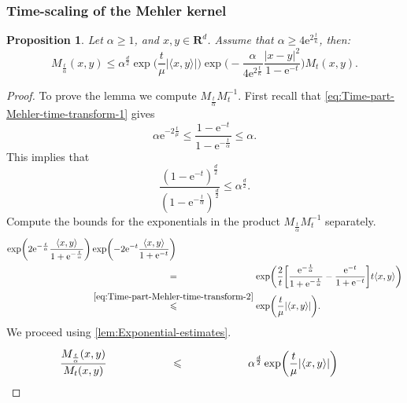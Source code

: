\documentclass[a4paper,oneside,10pt]{amsproc}
\newtheorem{proposition}{Proposition}
\theoremstyle{remark}
\newcommand{\la}{\langle}
\newcommand{\ra}{\rangle}
\renewcommand{\leq}{\leqslant}
\renewcommand{\leq}{\leqslant}
\renewcommand{\geq}{\geqslant}
\newcommand{\R}{\mathbf R}
\newcommand{\e}{\mathrm{e}} %
\renewcommand{\leq}{\leqslant}%
\renewcommand{\geq}{\geqslant}%
\begin{document}
\subsubsection{Time-scaling of the Mehler kernel}
\begin{proposition}\label{lem:Kernel-estimates-1}
  Let $\alpha \geq 1$, and $x, y \in \R^d$. Assume that $\alpha \geq 4 \e^{2
    \frac{t}{\kappa}}$, then:
  \begin{equation}
    \label{eq:Kernel-lemma-1-estimate} 
    M_{\frac{t}{\alpha}}(x, y) \leq \alpha^{\frac{d}2}
    \exp\biggl (\frac{t}{\mu} |\la x, y \ra| \biggr)
   \exp\biggl(-\frac{\alpha}{4\e^{2 \frac{t}{\kappa}}} \frac{|x - y|^2}{1 - \e^{-t}}
   \biggr) M_{t}(x, y).
  \end{equation}
\end{proposition}
\begin{proof}
  To prove the lemma we compute $M_{\frac{t}{\alpha}} M_t^{-1}$.
  First recall that \eqref{eq:Time-part-Mehler-time-transform-1} gives
  \begin{equation*}
    \alpha \e^{-2\frac{t}\mu} \leq \frac{1 - \e^{-t}}{1 -
      \e^{-\frac{t}{\alpha}}} \leq \alpha.
  \end{equation*}
  This implies that
  \begin{equation*}
    \frac{(1 - \e^{-t})^{\frac{d}2}}{(1 -
      \e^{-\frac{t}{\alpha}})^{\frac{d}{2}}} \leq \alpha^{\frac{d}2}.
  \end{equation*}
  Compute the bounds for the exponentials in the product $M_{\frac{t}{\alpha}}
  M_t^{-1}$ separately.
  \begin{align*}
    \exp \biggl (2\e^{-\frac{t}\alpha} \frac{\la x, y \ra}{1 + \e^{-\frac{t}{\alpha}}}
    \biggr ) &\exp \biggl (-2 \e^{-t} \frac{\la x, y \ra}{1 + \e^{-t}}
    \biggr )\\
    &\stackrel{\phantom{\eqref{eq:Time-part-Mehler-time-transform-2}}}{=}
    \exp\biggl (\frac2{t}\biggl[\frac{\e^{-\frac{t}\alpha}}{1 +
      \e^{-\frac{t}{\alpha}}} - \frac{\e^{-t}}{1 + \e^{-t}} \biggr] t \la x, y \ra \biggr)\\
    &\stackrel{\eqref{eq:Time-part-Mehler-time-transform-2}}{\leq}
    \exp\biggl (\frac{t}{\mu} |\la x, y \ra| \biggr).
  \end{align*}
  We proceed using \autoref{lem:Exponential-estimates}.
  \begin{align*}
    \frac{M_{\frac{t}{\alpha}}(x, y)}{M_{t}(x, y)} &\stackrel{\phantom{\eqref{eq:Exponential-estimates-1}}}{\leq}
    \alpha^{\frac{d}2} \exp\biggl (\frac{t}{\mu} |\la x, y \ra| \biggr)

\end{align*}
\end{proof}
\end{document}
